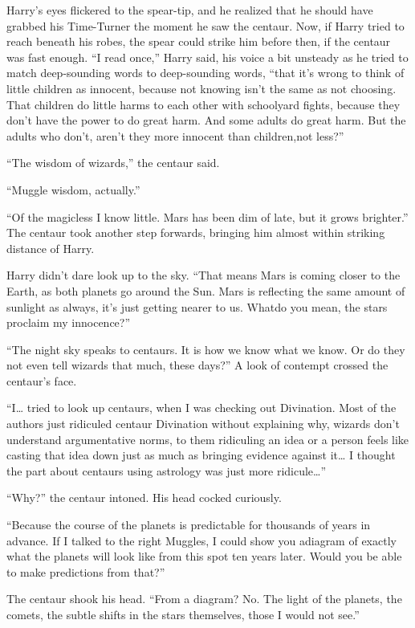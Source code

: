 Harry's eyes flickered to the spear-tip, and he realized that he should have grabbed his Time-Turner the moment he saw the centaur. Now, if Harry tried to reach beneath his robes, the spear could strike him before then, if the centaur was fast enough. ``I read once,'' Harry said, his voice a bit unsteady as he tried to match deep-sounding words to deep-sounding words, ``that it's wrong to think of little children as innocent, because not knowing isn't the same as not choosing. That children do little harms to each other with schoolyard fights, because they don't have the power to do great harm. And some adults do great harm. But the adults who don't, aren't they more innocent than children,not less?''

``The wisdom of wizards,'' the centaur said.

``Muggle wisdom, actually.''

``Of the magicless I know little. Mars has been dim of late, but it grows brighter.'' The centaur took another step forwards, bringing him almost within striking distance of Harry.

Harry didn't dare look up to the sky. ``That means Mars is coming closer to the Earth, as both planets go around the Sun. Mars is reflecting the same amount of sunlight as always, it's just getting nearer to us. Whatdo you mean, the stars proclaim my innocence?''

``The night sky speaks to centaurs. It is how we know what we know. Or do they not even tell wizards that much, these days?'' A look of contempt crossed the centaur's face.

``I\ldots{} tried to look up centaurs, when I was checking out Divination. Most of the authors just ridiculed centaur Divination without explaining why, wizards don't understand argumentative norms, to them ridiculing an idea or a person feels like casting that idea down just as much as bringing evidence against it\ldots{} I thought the part about centaurs using astrology was just more ridicule\ldots{}''

``Why?'' the centaur intoned. His head cocked curiously.

``Because the course of the planets is predictable for thousands of years in advance. If I talked to the right Muggles, I could show you adiagram of exactly what the planets will look like from this spot ten years later. Would you be able to make predictions from that?''

The centaur shook his head. ``From a diagram? No. The light of the planets, the comets, the subtle shifts in the stars themselves, those I would not see.''

